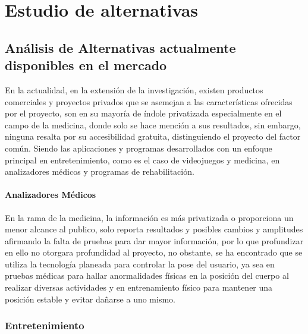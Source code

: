 \chapter{Estudio de alternativas}

\section{Análisis de Alternativas actualmente disponibles en el mercado}

En la actualidad, en la extensión de la investigación, existen productos comerciales y proyectos privados que se asemejan a las características ofrecidas por el proyecto, son en su mayoría de índole privatizada especialmente en el campo de la medicina, donde solo se hace mención a sus resultados, sin embargo, ninguna resalta por su accesibilidad gratuita, distinguiendo el proyecto del factor común. Siendo las aplicaciones y programas desarrollados con un enfoque principal en entretenimiento, como es el caso de videojuegos y medicina, en analizadores médicos y programas de rehabilitación.\\

\subsubsection{Analizadores Médicos}

En la rama de la medicina, la información es más privatizada o proporciona un menor alcance al publico, solo reporta resultados y posibles cambios y amplitudes afirmando la falta de pruebas para dar mayor información, por lo que profundizar en ello no otorgara profundidad al proyecto, no obstante, se ha encontrado que se utiliza la tecnología planeada para controlar la pose del usuario, ya sea en pruebas médicas para hallar anormalidades físicas en la posición del cuerpo al realizar diversas actividades y en entrenamiento físico para mantener una posición estable y evitar dañarse a uno mismo.

\subsection{Entretenimiento}

